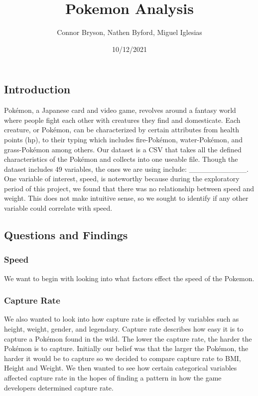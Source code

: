 \documentclass[
]{article}
\title{Pokemon Analysis}
\author{Connor Bryson, Nathen Byford, Miguel Iglesias}
\date{10/12/2021}
\begin{document}
\maketitle

\hypertarget{introduction}{%
\subsection{Introduction}\label{introduction}}

Pokémon, a Japanese card and video game, revolves around a fantasy world
where people fight each other with creatures they find and domesticate.
Each creature, or Pokémon, can be characterized by certain attributes
from health points (hp), to their typing which includes fire-Pokémon,
water-Pokémon, and grass-Pokémon among others. Our dataset is a CSV that
takes all the defined characteristics of the Pokémon and collects into
one useable file. Though the dataset includes 49 variables, the ones we
are using include: \_\_\_\_\_\_\_\_\_\_\_. One variable of interest,
speed, is noteworthy because during the exploratory period of this
project, we found that there was no relationship between speed and
weight. This does not make intuitive sense, so we sought to identify if
any other variable could correlate with speed.

\hypertarget{questions-and-findings}{%
\subsection{Questions and Findings}\label{questions-and-findings}}

\hypertarget{speed}{%
\subsubsection{Speed}\label{speed}}

We want to begin with looking into what factors effect the speed of the
Pokemon.

\hypertarget{capture-rate}{%
\subsubsection{Capture Rate}\label{capture-rate}}

We also wanted to look into how capture rate is effected by variables
such as height, weight, gender, and legendary. Capture rate describes
how easy it is to capture a Pokémon found in the wild. The lower the
capture rate, the harder the Pokémon is to capture. Initially our belief
was that the larger the Pokémon, the harder it would be to capture so we
decided to compare capture rate to BMI, Height and Weight. We then
wanted to see how certain categorical variables affected capture rate in
the hopes of finding a pattern in how the game developers determined
capture rate.
\end{document}
